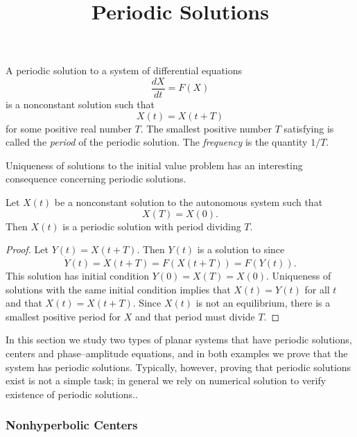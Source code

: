 \documentclass{ximera}
\title{Periodic Solutions}
\begin{document}
\begin{abstract}
\end{abstract}
\maketitle

 \label{S:periodic}

A periodic solution to a system of differential equations 
\begin{equation}  \label{e:genlveceqn}  
\frac{dX}{dt} = F(X)
\end{equation}
is a nonconstant solution such that 
\begin{equation}  \label{e:period}
X(t)=X(t+T)
\end{equation}
for some positive real number $T$.  The smallest positive number $T$
satisfying  is called the {\em period\/} 
of the periodic solution.  The {\em frequency\/} is 
the quantity $1/T$.
 
Uniqueness of solutions to the initial 
value problem has an interesting consequence concerning periodic solutions.
\begin{lemma}  
Let $X(t)$ be a nonconstant solution to the autonomous
system  such that 
\[
X(T)=X(0).
\]
Then $X(t)$ is a periodic solution with period dividing $T$.
\end{lemma}

\begin{proof}  Let $Y(t)=X(t+T)$.  Then $Y(t)$ is a solution to 
 since 
\[
\dot{Y}(t) = \dot{X}(t+T)=F(X(t+T))=F(Y(t)).
\]
This solution has initial condition $Y(0)=X(T)=X(0)$.  
Uniqueness of solutions with the same initial condition 
implies that $X(t)=Y(t)$ for all $t$ and that $X(t)=X(t+T)$.
Since $X(t)$ is not an equilibrium, there is a smallest 
positive period for $X$ and that period must divide $T$. \end{proof}

In this section we study two types of planar systems that have periodic 
solutions, centers and phase--amplitude equations, and in both examples 
we prove that the system has periodic solutions.  Typically, however, 
proving that periodic solutions exist is not a simple task; in general 
we rely on numerical solution to verify existence of periodic solutions..




\subsubsection*{Nonhyperbolic Centers}
\end{document}
